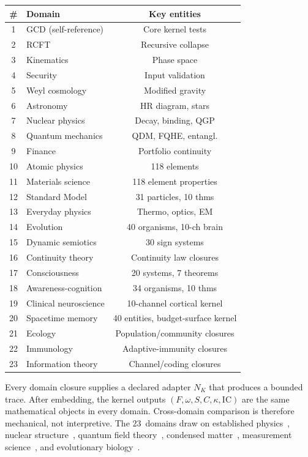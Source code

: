 \documentclass[
  aps,
  prd,
  twocolumn,
  superscriptaddress,
  nofootinbib,
  floatfix
]{revtex4-2}
\newcommand{\IC}{\mathrm{IC}}
\begin{document}
\begin{center}
\begin{tabular}{@{}clc@{}}
\toprule
\# & Domain & Key entities \\
\midrule
1 & GCD (self-reference) & Core kernel tests \\
2 & RCFT & Recursive collapse \\
3 & Kinematics & Phase space \\
4 & Security & Input validation \\
5 & Weyl cosmology & Modified gravity \\
6 & Astronomy & HR diagram, stars \\
7 & Nuclear physics & Decay, binding, QGP \\
8 & Quantum mechanics & QDM, FQHE, entangl. \\
9 & Finance & Portfolio continuity \\
10 & Atomic physics & 118 elements \\
11 & Materials science & 118 element properties \\
12 & Standard Model & 31 particles, 10 thms \\
13 & Everyday physics & Thermo, optics, EM \\
14 & Evolution & 40 organisms, 10-ch brain \\
15 & Dynamic semiotics & 30 sign systems \\
16 & Continuity theory & Continuity law closures \\
17 & Consciousness & 20 systems, 7 theorems \\
18 & Awareness-cognition & 34 organisms, 10 thms \\
19 & Clinical neuroscience & 10-channel cortical kernel \\
20 & Spacetime memory & 40 entities, budget-surface kernel \\
21 & Ecology & Population/community closures \\
22 & Immunology & Adaptive-immunity closures \\
23 & Information theory & Channel/coding closures \\
\bottomrule
\end{tabular}
\end{center}

Every domain closure supplies a declared adapter $N_K$ that
produces a bounded trace.  After embedding, the kernel outputs
$(F, \omega, S, C, \kappa, \IC)$ are the same mathematical objects
in every domain.  Cross-domain comparison is therefore mechanical,
not interpretive.  The 23~domains draw on established
physics~\cite{pdg2024,goldstein2002classical,landau1976mechanics,misner1973gravitation},
nuclear structure~\cite{weizsacker1935,bethe1936},
quantum field theory~\cite{gross1973,politzer1973,higgs1964,wilson1974confinement},
condensed matter~\cite{laughlin1983fqhe,kitaev2003toric},
measurement science~\cite{jcgm2008gum},
and evolutionary biology~\cite{darwin1859origin}.
\end{document}

